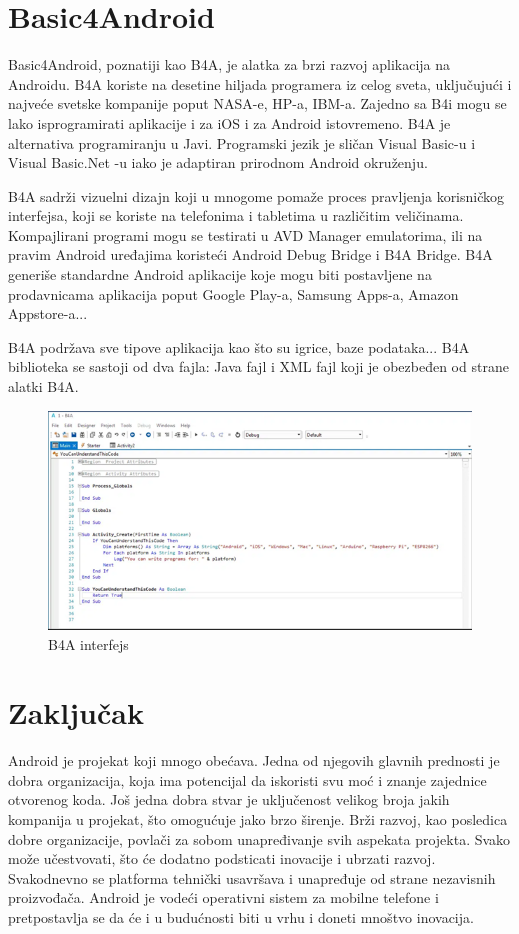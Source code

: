 \documentclass[12pt]{article}
\begin{document}
\section{Basic4Android}
Basic4Android, poznatiji kao B4A, je alatka za brzi razvoj aplikacija na Androidu. B4A koriste na desetine hiljada programera iz celog sveta, uključujući i najveće svetske kompanije poput NASA-e, HP-a, IBM-a.
Zajedno sa B4i mogu se lako isprogramirati aplikacije i za iOS i za Android istovremeno. B4A je alternativa programiranju u Javi. Programski jezik je sličan Visual Basic-u i Visual Basic.Net -u iako je adaptiran prirodnom Android okruženju.

B4A sadrži vizuelni dizajn koji u mnogome pomaže proces pravljenja korisničkog interfejsa, koji se koriste na telefonima i tabletima u različitim veličinama. Kompajlirani programi mogu se testirati u AVD Manager emulatorima, ili na pravim Android uređajima koristeći Android Debug Bridge i B4A Bridge. 
B4A generiše standardne Android aplikacije koje mogu biti postavljene na prodavnicama aplikacija poput Google Play-a, Samsung Apps-a, Amazon Appstore-a...

B4A podržava sve tipove aplikacija kao što su igrice, baze podataka... B4A biblioteka se sastoji od dva fajla: Java fajl i XML fajl koji je obezbeđen od strane alatki B4A.

\begin{figure}[ht!]
    \centering
    \includegraphics[scale=0.9]{b4aslika.png}
    \caption{B4A interfejs}
\end{figure}
\section{Zaključak}

Android je projekat koji mnogo obećava. Jedna od njegovih glavnih prednosti je dobra organizacija, koja ima potencijal da iskoristi svu moć i znanje zajednice otvorenog koda. Još jedna dobra stvar je uključenost velikog broja jakih kompanija u projekat, što omogućuje jako brzo širenje.
Brži razvoj, kao posledica dobre organizacije, povlači za sobom unapređivanje svih aspekata projekta.
Svako može učestvovati, što će dodatno podsticati inovacije i ubrzati razvoj.
Svakodnevno se platforma tehnički usavršava i unapređuje od strane nezavisnih
proizvođača. Android je vodeći operativni sistem za mobilne telefone i pretpostavlja se da će
i u budućnosti biti u vrhu i doneti mnoštvo inovacija.
\end{document}
